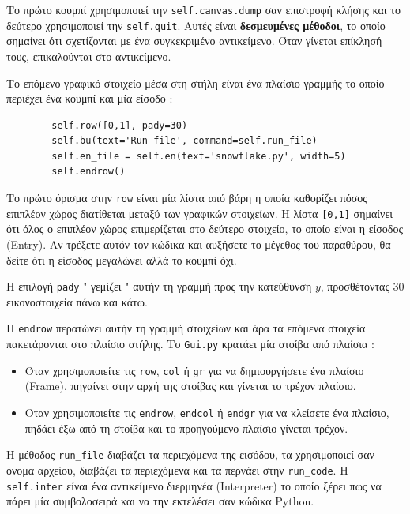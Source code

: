 \documentclass[10pt]{book}
\begin{document}
Το πρώτο κουμπί χρησιμοποιεί την  {\tt self.canvas.dump}  σαν επιστροφή κλήσης και το 
δεύτερο χρησιμοποιεί την  {\tt self.quit}.   Αυτές είναι {\bf δεσμευμένες μέθοδοι}, το οποίο σημαίνει ότι σχετίζονται με ένα συγκεκριμένο αντικείμενο.  Όταν γίνεται επίκλησή τους, 
επικαλούνται στο αντικείμενο.

Το επόμενο γραφικό στοιχείο μέσα στη στήλη είναι ένα πλαίσιο γραμμής το οποίο περιέχει 
ένα κουμπί και μία είσοδο :

\begin{verbatim}
        self.row([0,1], pady=30)
        self.bu(text='Run file', command=self.run_file)
        self.en_file = self.en(text='snowflake.py', width=5)
        self.endrow()
\end{verbatim}
%
 Το πρώτο όρισμα στην  {\tt row}  είναι μία λίστα από βάρη η οποία καθορίζει πόσος 
επιπλέον χώρος διατίθεται μεταξύ των γραφικών στοιχείων.  Η λίστα  {\tt [0,1]}  σημαίνει ότι όλος ο επιπλέον χώρος επιμερίζεται στο δεύτερο στοιχείο, το οποίο είναι η είσοδος  (Entry).   Αν τρέξετε αυτόν τον κώδικα και αυξήσετε το μέγεθος του παραθύρου, 
θα δείτε ότι η είσοδος μεγαλώνει αλλά το κουμπί όχι.

Η επιλογή  {\tt pady} " γεμίζει "  αυτήν τη γραμμή προς την κατεύθυνση $y$, 
προσθέτοντας 30 εικονοστοιχεία πάνω και κάτω.

Η  {\tt endrow}  περατώνει αυτήν τη γραμμή στοιχείων και άρα τα επόμενα στοιχεία 
πακετάρονται στο πλαίσιο στήλης.  Το  {\tt Gui.py}  κρατάει μία στοίβα από πλαίσια :


\begin{itemize}

\item  Όταν χρησιμοποιείτε τις  {\tt row}, {\tt col}  ή  {\tt gr}  για 
να δημιουργήσετε ένα πλαίσιο  (Frame),  πηγαίνει στην αρχή της στοίβας και γίνεται 
το τρέχον πλαίσιο.

\item Όταν χρησιμοποιείτε τις  {\tt endrow}, {\tt endcol}  ή  {\tt endgr}  για 
να κλείσετε ένα πλαίσιο, πηδάει έξω από τη στοίβα και το προηγούμενο πλαίσιο γίνεται τρέχον.

\end{itemize}

Η μέθοδος  \verb"run_file"  διαβάζει τα περιεχόμενα της εισόδου, τα χρησιμοποιεί σαν 
όνομα αρχείου, διαβάζει τα περιεχόμενα και τα περνάει στην  \verb"run_code".   Η  
{\tt self.inter}  είναι ένα αντικείμενο διερμηνέα  (Interpreter)  το οποίο ξέρει 
πως να πάρει μία συμβολοσειρά και να την εκτελέσει σαν κώδικα  Python.
\end{document}
